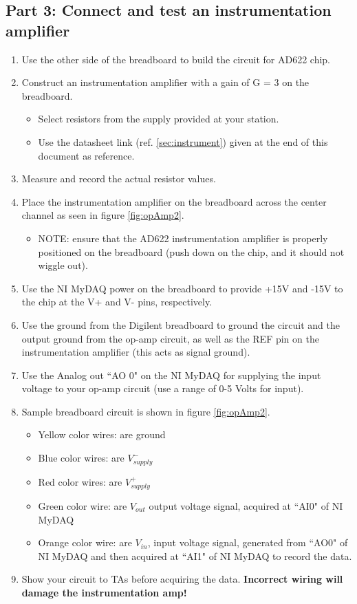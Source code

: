 \documentclass{article} %
\begin{document}
\subsection{Part 3: Connect and test an instrumentation amplifier}
\begin{enumerate}
    \item Use the other side of the breadboard to build the circuit for AD622 chip.
    \item Construct an instrumentation amplifier with a gain of G = 3 on the breadboard. 
    \begin{itemize}
        \item Select resistors from the supply provided at your station.
        \item Use the datasheet link (ref. \ref{sec:instrument}) given at the end of this document as reference.
    \end{itemize}
    \item Measure and record the actual resistor values.
    \item Place the instrumentation amplifier on the breadboard across the center channel as seen in figure \ref{fig:opAmp2}.
    \begin{itemize}
        \item NOTE: ensure that the AD622 instrumentation amplifier is properly positioned on the breadboard (push down on the chip, and it should not wiggle out).
    \end{itemize}
    \item Use the NI MyDAQ power on the breadboard to provide +15V and -15V to the chip at the V+ and V- pins, respectively.
    \item Use the ground from the Digilent breadboard to ground the circuit and the output ground from the op-amp circuit, as well as the REF pin on the instrumentation amplifier (this acts as signal ground).  
    \item Use the Analog out ``AO 0" on the NI MyDAQ for supplying the input voltage to your op-amp circuit (use a range of 0-5 Volts for input). 
    \item Sample breadboard circuit is shown in figure \ref{fig:opAmp2}.
    \begin{itemize}
        \item Yellow color wires: are  ground 
        \item Blue color wires: are $V^{-}_{supply}$ 
        \item Red color wires: are $V^{+}_{supply}$ 
        \item Green color wire: are $V_{out}$ output voltage signal, acquired at ``AI0" of NI MyDAQ
        \item Orange color wire: are $V_{in}$, input voltage signal, generated from ``AO0" of NI MyDAQ and then acquired at ``AI1" of NI MyDAQ to record the data.
\end{itemize}
    \item Show your circuit to TAs before acquiring the data. {\bf Incorrect wiring will damage the instrumentation amp!}
\end{enumerate}
\end{document}
